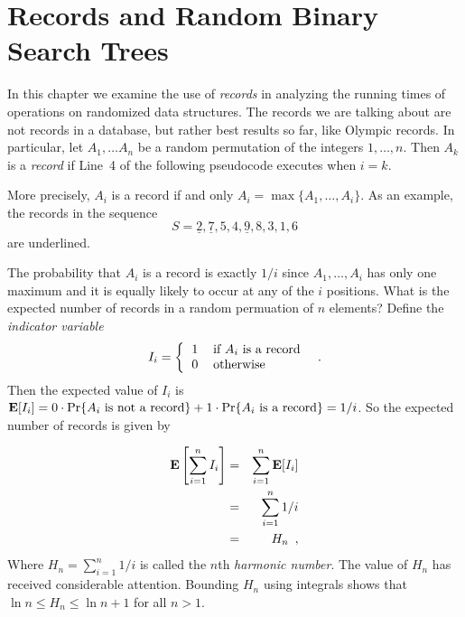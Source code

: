 \chapter{Records and Random Binary Search Trees}


In this chapter we examine the use of \emph{records} in analyzing the
running times of operations on randomized data structures.  The
records we are talking about are not records in a database, but rather
best results so far, like Olympic records.  In particular, let
$A_1,\ldots A_n$ be a random permutation of the integers $1,\ldots,n$.
Then $A_k$ is a \emph{record} if Line~4 of the following pseudocode
 executes when $i=k$. \\

\begin{algorithmic}[1]
  \ENDIF
\ENDFOR
\end{algorithmic}

More precisely, $A_i$ is a record if and only
$A_i=\max\{A_1,\ldots,A_i\}$.  As an example, the records in the
sequence
\[
 	S = \underline{2}, \underline{7}, 5, 4, \underline{9}, 8, 3, 1, 6
\]
are underlined.

The probability that $A_i$ is a record is exactly $1/i$ since
$A_1,\ldots,A_i$ has only one maximum and it is equally likely to
occur at any of the $i$ positions.  What is the expected number of
records in a random permuation of $n$ elements?  Define the
\emph{indicator variable}
\[
I_i = \left\{\begin{tabular}{ll}
             1 & \mbox{if $A_i$ is a record} \\
             0 & \mbox{otherwise} \end{tabular}\right. \enspace .
\]
Then the expected value of $I_i$ is $\mathbf{E}[I_i]=0\cdot\Pr\{\mbox{$A_i$ is not a record}\}+1\cdot\Pr\{\mbox{$A_i$ is a
record}\}=1/i$.  So the expected number of records is given by 

\begin{eqnarray}
\mathbf{E}\left[\sum_{i=1}^n I_i\right]
  & = & \sum_{i=1}^n \mathbf{E}[I_i] \\
  & = & \sum_{i=1}^n 1/i \\
  & = & H_n \enspace ,
\end{eqnarray}
Where $H_n=\sum_{i=1}^n 1/i$ is called the $n$th \emph{harmonic
number}.  The value of $H_n$ has received considerable attention.
Bounding $H_n$ using integrals \cite[Section~3.2]{clr90} shows that
$\ln n\le H_n\le\ln n+1$ for all $n > 1$.


